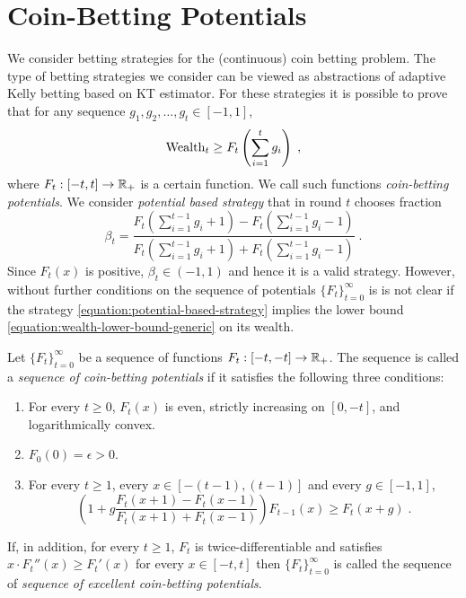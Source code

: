 \section{Coin-Betting Potentials}

We consider betting strategies for the (continuous) coin betting problem. The
type of betting strategies we consider can be viewed as abstractions of
adaptive Kelly betting based on KT estimator. For these strategies
it is possible to prove that for any sequence $g_1, g_2, \dots, g_t \in [-1,1]$,
\begin{equation}
\label{equation:wealth-lower-bound-generic}
\operatorname{Wealth}_t \ge F_t \left( \sum_{i=1}^t g_i \right) \; ,
\end{equation}
where $F_t:[-t,t] \to \mathbb{R}_+$ is a certain function. We call such functions
\emph{coin-betting potentials}. We consider \emph{potential based strategy}
that in round $t$ chooses fraction
\begin{equation}
\label{equation:potential-based-strategy}
\beta_t = \frac{F_t(\sum_{i=1}^{t-1} g_i + 1) - F_t(\sum_{i=1}^{t-1} g_i - 1)}{F_t(\sum_{i=1}^{t-1} g_i + 1) + F_t(\sum_{i=1}^{t-1} g_i - 1)} \; .
\end{equation}
Since $F_t(x)$ is positive, $\beta_t \in (-1,1)$ and hence it is a valid
strategy. However, without further conditions on the sequence of potentials
$\{F_t\}_{t=0}^\infty$ is is not clear if the strategy
\eqref{equation:potential-based-strategy} implies the lower bound
\eqref{equation:wealth-lower-bound-generic} on its wealth.

\begin{definition}
Let $\{F_t\}_{t=0}^\infty$ be a sequence of functions $F_t:[-t,-t] \to \mathbb{R}_+$. The
sequence is called a \emph{sequence of coin-betting potentials} if it satisfies
the following three conditions:
\begin{enumerate}
\item For every $t \ge 0$, $F_t(x)$ is even, strictly increasing on $[0,-t]$, and logarithmically convex.
\item $F_0(0) = \epsilon > 0$.
\item For every $t \ge 1$, every $x \in [-(t-1), (t-1)]$ and every $g \in [-1,1]$,
$$
\left(1 + g \frac{F_t(x + 1) - F_t(x - 1)}{F_t(x + 1) + F_t(x - 1)} \right) F_{t-1}(x) \ge F_t(x+g) \; .
$$
\end{enumerate}
If, in addition, for every $t \ge 1$, $F_t$ is twice-differentiable and
satisfies $x \cdot F_t''(x) \ge F_t'(x)$ for every $x \in [-t,t]$ then
$\{F_t\}_{t=0}^\infty$ is called the sequence of \emph{sequence of excellent
coin-betting potentials}.
\end{definition}

